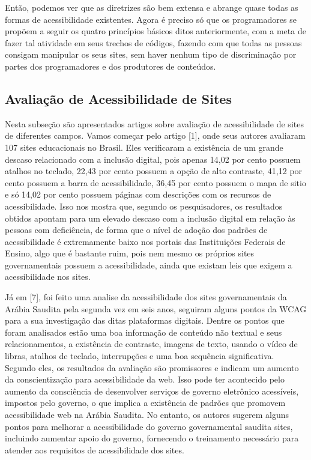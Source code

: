 \documentclass[a4paper]{article}
\begin{document}
\begin{titlepage}
Então, podemos ver que as diretrizes são bem extensa e abrange quase todas as formas de acessibilidade existentes. Agora é preciso só que os programadores se propõem a seguir os quatro princípios básicos ditos anteriormente, com a meta de fazer tal atividade em seus trechos de códigos, fazendo com que todas as pessoas consigam manipular os seus sites, sem haver nenhum tipo de discriminação por partes dos programadores e dos produtores de conteúdos.

\subsection{Avaliação de Acessibilidade de Sites}
Nesta subseção são apresentados artigos sobre avaliação de acessibilidade de sites de diferentes campos.  Vamos começar pelo artigo [1], onde seus autores avaliaram 107 sites educacionais no Brasil. Eles verificaram a existência de um grande descaso relacionado com a inclusão digital, pois apenas 14,02 por cento possuem atalhos no teclado, 22,43 por cento possuem a opção de alto contraste, 41,12 por cento possuem a barra de acessibilidade, 36,45 por cento possuem o mapa de sitio e só 14,02 por cento possuem páginas com descrições com os recursos de acessibilidade. Isso nos mostra que, segundo os pesquisadores, os resultados obtidos apontam para um elevado descaso com a inclusão digital em relação às pessoas com deficiência, de forma que o nível de adoção dos padrões de acessibilidade é extremamente baixo nos portais das Instituições Federais de Ensino, algo que é bastante ruim, pois nem mesmo os próprios sites governamentais possuem a acessibilidade, ainda que existam leis que exigem a acessibilidade nos sites.

Já em [7], foi feito uma analise da acessibilidade dos sites governamentais da Arábia Saudita pela segunda vez em seis anos, seguiram alguns pontos da WCAG para a sua investigação das ditas plataformas digitais. Dentre os pontos que foram analisados estão uma boa informação de conteúdo não textual e seus relacionamentos, a existência de contraste, imagens de texto, usando o vídeo de libras, atalhos de teclado, interrupções e uma boa sequência significativa. Segundo eles, os resultados da avaliação são promissores e indicam um aumento da conscientização para acessibilidade da web. Isso pode ter acontecido pelo aumento da consciência de desenvolver serviços de governo eletrônico acessíveis, impostos pelo governo, o que implica a existência de padrões que promovem acessibilidade web na Arábia Saudita. No entanto, os autores sugerem alguns pontos para melhorar a acessibilidade do governo governamental saudita sites, incluindo aumentar apoio do governo, fornecendo o treinamento necessário para atender aos requisitos de acessibilidade dos sites.


\end{titlepage}
\end{document}
